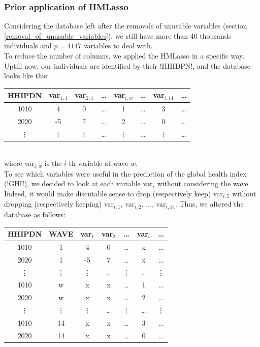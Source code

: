 \documentclass[]{article}
\begin{document}
\subsubsection{Prior application of HMLasso}
Considering the database left after the removals of unusable variables (section \ref{removal_of_unusable_variables}), we still have more than $40$ thousands individuals and $p=4147$ variables to deal with.\\
To reduce the number of columns, we applied the HMLasso in a specific way. Uptill now, our individuals are identified by their \pyth!HHIDPN!, and the database looks like this:
\begin{table}[!h]
\centering
\label{data_03}
\begin{tabular}{|c|c|c|c|c|c|c|c|}
	\hline
	\textbf{HHIPDN} & \textbf{var$_{1,1}$} & \textbf{var$_{2,1}$} & \dots & \textbf{var$_{i,w}$} & \dots & \textbf{var$_{i,14}$} & \dots\\
	\hline
	1010 & 4 & 0 & \dots & 1 & \dots & 3 & \dots\\
	\hline
	2020 & -5 & 7 & \dots & 2 & \dots & 0 & \dots\\
	\hline
	\vdots & \vdots & \vdots & \dots & \vdots & \dots & \vdots & \dots \\
	\hline
\end{tabular}
\end{table}\\
where var$_{i, w}$ is the $i$-th variable at wave $w$.\\
To see which variables were useful in the prediction of the global health index (\pyth!GHI!), we decided to look at each variable var$_i$ without considering the wave. Indeed, it would make discutable sense to drop (respectively keep) var$_{i, 5}$ without dropping (respectively keeping) var$_{i, 1}$, var$_{i, 2}$, $\dots$, var$_{i, 14}$. Thus, we altered the database as follows:\\
\begin{table}[!h]
	\centering
	\label{data_03_lasso}
	\begin{tabular}{|c|c|c|c|c|c|c|}
		\hline
		\textbf{HHIPDN} & \textbf{WAVE} & \textbf{var$_{1}$} & \textbf{var$_{2}$} & \dots & \textbf{var$_{i}$} & \dots\\
		\hline
		1010 & 1 & 4 & 0 & \dots & x & \dots\\
		\hline
		2020 & 1 & -5 & 7 & \dots & x & \dots\\
		\hline
		\vdots & \vdots & \vdots & \dots & \vdots & \dots & \vdots \\
		\hline
		1010 & w & x & x & \dots & 1 & \dots\\
		\hline
		2020 & w & x & x & \dots & 2 & \dots\\
		\hline
		\vdots & \vdots & \vdots & \dots & \vdots & \dots & \vdots \\
		\hline
		1010 & 14 & x & x & \dots & 3 & \dots\\
		\hline
		2020 & 14 & x & x & \dots & 0 & \dots\\
		\hline
	\end{tabular}
\end{table}\\
\end{document}
